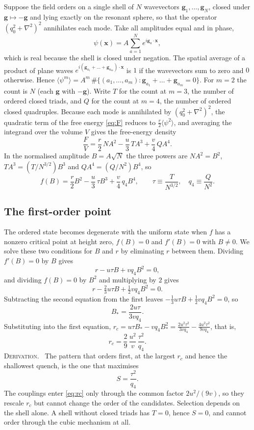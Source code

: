 \documentclass[a4paper,11pt]{article}
\makeatletter
\numberwithin{equation}{section}
\theoremstyle{jsplain}
\theoremstyle{jsrem}
\newcommand{\lbl}[1]{\textcolor{lbl@#1}{\textsc{#1}}.\ }
\makeatother
\begin{document}
Suppose the field orders on a single shell of $N$ wavevectors $\mathbf{g}_1,\dots,\mathbf{g}_N$, closed under $\mathbf{g}\mapsto-\mathbf{g}$ and lying exactly on the resonant sphere, so that the operator $(q_0^2+\nabla^2)^2$ annihilates each mode. Take all amplitudes equal and in phase,
\[
\psi(\mathbf{x})=A\sum_{a=1}^{N}e^{i\mathbf{g}_a\cdot\mathbf{x}},
\]
which is real because the shell is closed under negation. The spatial average of a product of plane waves $e^{i(\mathbf{g}_{a_1}+\dots+\mathbf{g}_{a_m})\cdot\mathbf{x}}$ is $1$ if the wavevectors sum to zero and $0$ otherwise. Hence $\langle\psi^m\rangle=A^m\,\#\{(a_1,\dots,a_m):\mathbf{g}_{a_1}+\dots+\mathbf{g}_{a_m}=0\}$. For $m=2$ the count is $N$ (each $\mathbf{g}$ with $-\mathbf{g}$). Write $T$ for the count at $m=3$, the number of ordered closed triads, and $Q$ for the count at $m=4$, the number of ordered closed quadruples. Because each mode is annihilated by $(q_0^2+\nabla^2)^2$, the quadratic term of the free energy \eqref{eq:F} reduces to $\tfrac r2\langle\psi^2\rangle$, and averaging the integrand over the volume $V$ gives the free-energy density
\begin{equation}\label{eq:Fshell}
\frac{F}{V}=\frac r2\,NA^2-\frac u3\,TA^3+\frac v4\,QA^4 .
\end{equation}
In the normalised amplitude $B=A\sqrt N$ the three powers are $NA^2=B^2$, $TA^3=(T/N^{3/2})B^3$ and $QA^4=(Q/N^2)B^4$, so
\begin{equation}\label{eq:FB}
f(B)=\frac r2B^2-\frac u3\,\tau B^3+\frac v4\,q_4B^4,\qquad \tau\equiv\frac{T}{N^{3/2}},\quad q_4\equiv\frac{Q}{N^2}.
\end{equation}

\subsection{The first-order point}

The ordered state becomes degenerate with the uniform state when $f$ has a nonzero critical point at height zero, $f(B)=0$ and $f'(B)=0$ with $B\ne0$. We solve these two conditions for $B$ and $r$ by eliminating $r$ between them. Dividing $f'(B)=0$ by $B$ gives
\[
r-u\tau B+vq_4B^2=0,
\]
and dividing $f(B)=0$ by $B^2$ and multiplying by $2$ gives
\[
r-\tfrac23u\tau B+\tfrac12vq_4B^2=0 .
\]
Subtracting the second equation from the first leaves $-\tfrac13u\tau B+\tfrac12vq_4B^2=0$, so
\[
B_*=\frac{2u\tau}{3vq_4}.
\]
Substituting into the first equation, $r_c=u\tau B_*-vq_4B_*^2=\frac{2u^2\tau^2}{3vq_4}-\frac{4u^2\tau^2}{9vq_4}$, that is,
\begin{equation}\label{eq:rc}
r_c=\frac29\,\frac{u^2}{v}\,\frac{\tau^2}{q_4}.
\end{equation}
\lbl{Derivation} The pattern that orders first, at the largest $r_c$ and hence the shallowest quench, is the one that maximises
\begin{equation}\label{eq:S}
S=\frac{\tau^2}{q_4}.
\end{equation}
The couplings enter \eqref{eq:rc} only through the common factor $2u^2/(9v)$, so they rescale $r_c$ but cannot change the order of the candidates. Selection depends on the shell alone. A shell without closed triads has $T=0$, hence $S=0$, and cannot order through the cubic mechanism at all.
\end{document}
